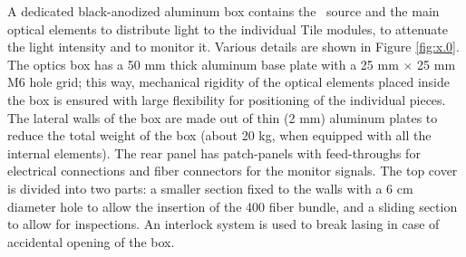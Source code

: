 A dedicated black-anodized aluminum box contains the \laser~source and the main optical
elements to distribute light to the individual Tile modules, to attenuate the light
intensity and to monitor it. Various details are shown in Figure \ref{fig:x.0}. The
optics box has a 50 mm thick aluminum base plate with a 25 mm $\times$ 25 mm M6 hole
grid; this way, mechanical rigidity of the optical elements 
placed inside the box is ensured with large flexibility for positioning of the
individual pieces. The lateral walls of the box are made out of thin (2 mm) aluminum
plates to
reduce the total weight of the box (about 20 kg, when equipped with all the internal
elements). The rear panel has patch-panels with feed-throughs for electrical
connections and fiber connectors for the monitor signals. The top cover is divided
into two parts: a smaller section fixed to the walls with a 6 cm diameter hole to
allow the insertion of the 400 fiber bundle, and a sliding section to allow for
inspections.  An interlock system is used to break lasing in case of accidental
opening of the box. 
